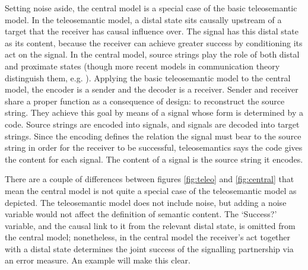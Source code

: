 \documentclass[12pt]{article}
\begin{document}
Setting noise aside, the central model is a special case of the basic teleosemantic model.
%
In the teleosemantic model, a distal state sits causally upstream of a target that the receiver has causal influence over.
The signal has this distal state as its content, because the receiver can achieve greater success by conditioning its act on the signal.
In the central model, source strings play the role of both distal and proximate states (though more recent models in communication theory distinguish them, e.g. \citet{berger1996ceo}).
Applying the basic teleosemantic model to the central model, the encoder is a sender and the decoder is a receiver.
Sender and receiver share a proper function as a consequence of design: to reconstruct the source string.
They achieve this goal by means of a signal whose form is determined by a code.
Source strings are encoded into signals, and signals are decoded into target strings.
Since the encoding defines the relation the signal must bear to the source string in order for the receiver to be successful, teleosemantics says the code gives the content for each signal.
The content of a signal is the source string it encodes.

There are a couple of differences between figures \ref{fig:teleo} and \ref{fig:central} that mean the central model is not quite a special case of the teleosemantic model as depicted.
The teleosemantic model does not include noise, but adding a noise variable would not affect the definition of semantic content.
The `Success?' variable, and the causal link to it from the relevant distal state, is omitted from the central model; nonetheless, in the central model the receiver's act together with a distal state determines the joint success of the signalling partnership via an error measure.
An example will make this clear.
\end{document}

